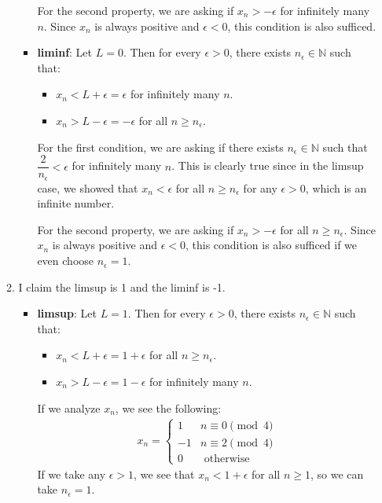 \documentclass{article}%
\begin{document}
\begin{enumerate}
\begin{enumerate}
\begin{itemize}
            For the second property, we are asking if $x_n > -\epsilon$ for infinitely many $n$. Since $x_n$ is always positive and $\epsilon < 0$, this condition is also sufficed.
            \item \textbf{liminf}: Let $L = 0$. Then for every $\epsilon > 0$, there exists $n_\epsilon \in \mathbb{N}$ such that:
            \begin{itemize}
                \item $x_n < L + \epsilon = \epsilon$ for infinitely many $n$.
                \item $x_n > L - \epsilon = -\epsilon$ for all $n \geq n_\epsilon$.
            \end{itemize}
            For the first condition, we are asking if there exists $n_\epsilon \in \mathbb{N}$ such that $\dfrac{2}{n_\epsilon} < \epsilon$ for infinitely many $n$. This is clearly true since in the limsup case, we showed that $x_n < \epsilon$ for all $n \geq n_\epsilon$ for any $\epsilon > 0$, which is an infinite number.

            For the second property, we are asking if $x_n > -\epsilon$ for all $n \geq n_\epsilon$. Since $x_n$ is always positive and $\epsilon < 0$, this condition is also sufficed if we even choose $n_\epsilon = 1$.
        \end{itemize}
        \item I claim the limsup is 1 and the liminf is -1. 
        \begin{itemize}
            \item \textbf{limsup}: Let $L = 1$. Then for every $\epsilon > 0$, there exists $n_\epsilon \in \mathbb{N}$ such that:
            \begin{itemize}
                \item $x_n < L + \epsilon = 1 + \epsilon$ for all $n \geq n_\epsilon$.
                \item $x_n > L - \epsilon = 1 - \epsilon$ for infinitely many $n$.
            \end{itemize}
            If we analyze $x_n$, we see the following:
            \begin{align*}
                x_n = \begin{cases} 1 & n \equiv 0 \pmod{4}\\ -1 & n \equiv 2 \pmod{4}\\ 0 & \text{ otherwise}\end{cases}
            \end{align*}
            If we take any $\epsilon > 1$, we see that $x_n < 1 + \epsilon$ for all $n \geq 1$, so we can take $n_\epsilon = 1$. 
            

\end{itemize}
\end{enumerate}
\end{enumerate}
\end{document}
